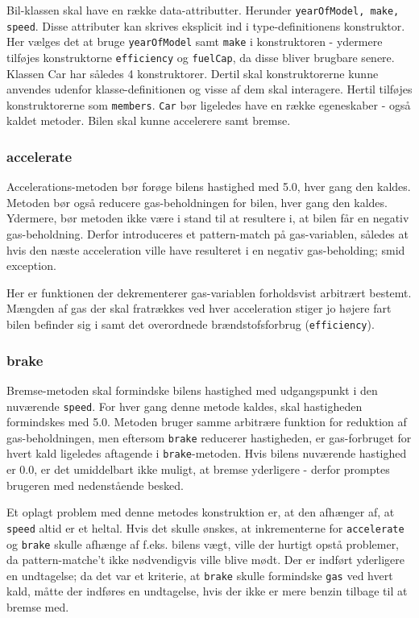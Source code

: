 \documentclass[a4paper,10pt]{article}
\begin{document}
Bil-klassen skal have en række data-attributter. Herunder \texttt{yearOfModel, make, speed}. Disse attributer kan skrives eksplicit ind i type-definitionens konstruktor. Her vælges det at bruge \texttt{yearOfModel} samt \texttt{make} i konstruktoren - ydermere tilføjes konstruktorne \texttt{efficiency} og \texttt{fuelCap}, da disse bliver brugbare senere. Klassen Car har således 4 konstruktorer. \newline
Dertil skal konstruktorerne kunne anvendes udenfor klasse-definitionen og visse af dem skal interagere. Hertil tilføjes konstruktorerne som \texttt{members}. \texttt{Car} bør ligeledes have en række egeneskaber - også kaldet metoder. Bilen skal kunne accelerere samt bremse.

\subsubsection{accelerate}

Accelerations-metoden bør forøge bilens hastighed med 5.0, hver gang den kaldes. Metoden bør også reducere gas-beholdningen for bilen, hver gang den kaldes. Ydermere, bør metoden ikke være i stand til at resultere i, at bilen får en negativ gas-beholdning. Derfor introduceres et pattern-match på gas-variablen, således at hvis den næste acceleration ville have resulteret i en negativ gas-beholding; smid exception. 

Her er funktionen der dekrementerer gas-variablen forholdsvist arbitrært bestemt. Mængden af gas der skal fratrækkes ved hver acceleration stiger jo højere fart bilen befinder sig i samt det overordnede brændstofsforbrug (\texttt{efficiency}). 

\subsubsection{brake}

Bremse-metoden skal formindske bilens hastighed med udgangspunkt i den nuværende \texttt{speed}. For hver gang denne metode kaldes, skal hastigheden formindskes med 5.0. Metoden bruger samme arbitrære funktion for reduktion af gas-beholdningen, men eftersom \texttt{brake} reducerer hastigheden, er gas-forbruget for hvert kald ligeledes aftagende i \texttt{brake}-metoden. Hvis bilens nuværende hastighed er 0.0, er det umiddelbart ikke muligt, at bremse yderligere - derfor promptes brugeren med nedenstående besked.   

Et oplagt problem med denne metodes konstruktion er, at den afhænger af, at \texttt{speed} altid er et heltal. Hvis det skulle ønskes, at inkrementerne for \texttt{accelerate} og \texttt{brake} skulle afhænge af f.eks. bilens vægt, ville der hurtigt opstå problemer, da pattern-matche't ikke nødvendigvis ville blive mødt. Der er indført yderligere en undtagelse; da det var et kriterie, at \texttt{brake} skulle formindske \texttt{gas} ved hvert kald, måtte der indføres en undtagelse, hvis der ikke er mere benzin tilbage til at bremse med.  
\end{document}
